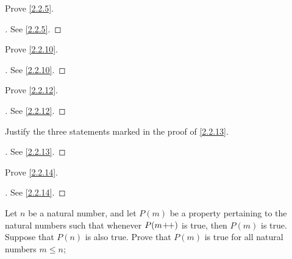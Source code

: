 \exercisesection

\begin{ex}\label{ex:2.2.1}
  Prove \cref{2.2.5}.
\end{ex}

\begin{proof}[]
  See \cref{2.2.5}.
\end{proof}

\begin{ex}\label{ex:2.2.2}
  Prove \cref{2.2.10}.
\end{ex}

\begin{proof}[]
  See \cref{2.2.10}.
\end{proof}

\begin{ex}\label{ex:2.2.3}
  Prove \cref{2.2.12}.
\end{ex}

\begin{proof}[]
  See \cref{2.2.12}.
\end{proof}

\begin{ex}\label{ex:2.2.4}
  Justify the three statements marked in the proof of \cref{2.2.13}.
\end{ex}

\begin{proof}[]
  See \cref{2.2.13}.
\end{proof}

\begin{ex}\label{ex:2.2.5}
  Prove \cref{2.2.14}.
\end{ex}

\begin{proof}[]
  See \cref{2.2.14}.
\end{proof}

\begin{ex}\label{ex:2.2.6}
  Let \(n\) be a natural number, and let \(P(m)\) be a property pertaining to the natural numbers such that whenever \(P(m\!+\!\!+)\) is true, then \(P(m)\) is true.
  Suppose that \(P(n)\) is also true.
  Prove that \(P(m)\) is true for all natural numbers \(m \leq n\);
\end{ex}

